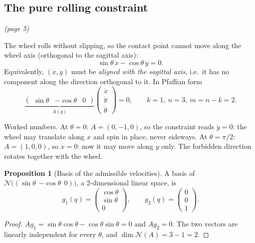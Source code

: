 \documentclass[11pt,a4paper]{article}
\newcommand{\N}{\mathcal{N}}
\theoremstyle{definition}
\newtheorem{proposition}[theorem]{Proposition}
\begin{document}
\subsection{The pure rolling constraint}\emph{(page 5)}

The wheel rolls without slipping, so the contact point cannot move along the wheel axis (orthogonal to the sagittal axis):
\[
\sin\theta\,\dot x-\cos\theta\,\dot y=0 .
\]
Equivalently, $(\dot x,\dot y)$ must be \emph{aligned with the sagittal axis}, i.e.\ it has no component along the direction orthogonal to it. In Pfaffian form
\[
\underbrace{\begin{pmatrix}\sin\theta & -\cos\theta & 0\end{pmatrix}}_{A(q)}\begin{pmatrix}\dot x\\ \dot y\\ \dot\theta\end{pmatrix}=0,\qquad k=1,\ n=3,\ m=n-k=2 .
\]

\begin{intuition}
Worked numbers. At $\theta=0$: $A=(0,-1,0)$, so the constraint reads $\dot y=0$: the wheel may translate along $x$ and spin in place, never sideways. At $\theta=\pi/2$: $A=(1,0,0)$, so $\dot x=0$: now it may move along $y$ only. The forbidden direction rotates together with the wheel.
\end{intuition}

\begin{proposition}[Basis of the admissible velocities]\label{prop:basis}
A basis of $\N\big((\sin\theta\ \ {-\cos\theta}\ \ 0)\big)$, a 2-dimensional linear space, is
\[
g_1(q)=\begin{pmatrix}\cos\theta\\ \sin\theta\\ 0\end{pmatrix},\qquad g_2(q)=\begin{pmatrix}0\\0\\1\end{pmatrix}.
\]
\end{proposition}
\begin{proof}
$A g_1=\sin\theta\cos\theta-\cos\theta\sin\theta=0$ and $Ag_2=0$. The two vectors are linearly independent for every $\theta$, and $\dim\N(A)=3-1=2$.
\end{proof}
\end{document}
